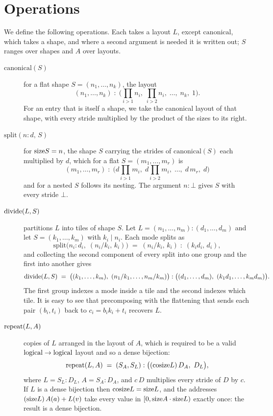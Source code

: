 \section{Operations}\label{sec:ops}

We define the following operations. Each takes a layout $L$, except
$\mathrm{canonical}$, which takes a shape, and where a second argument is
needed it is written out; $S$ ranges over shapes and $A$ over
layouts.

\begin{description}
\item[$\mathrm{canonical}(S)$] for a flat shape $S = (n_1,\dots,n_k)$, the
layout
\[
(n_1,\dots,n_k) \;{:}\; \Big(\textstyle\prod_{i>1} n_i,\;
\prod_{i>2} n_i,\; \dots,\; n_k,\; 1\Big).
\]
For an entry that is itself a shape, we take the canonical layout
of that shape, with every stride multiplied by the product of the sizes to its
right.
\par\smallskip



\item[$\mathrm{split}(n{:}d,\, S)$] for $\mathrm{size} S = n$, the shape $S$ carrying
the strides of $\mathrm{canonical}(S)$ each multiplied by $d$, which for a flat
$S = (m_1,\dots,m_r)$ is
\[
(m_1,\dots,m_r) \;{:}\;
\Big(d\textstyle\prod_{i>1} m_i,\; d\prod_{i>2} m_i,\; \dots,\; d\,m_r,\; d\Big)
\]
and for a nested $S$ follows its nesting. The argument $n{:}\bot$ gives $S$
with every stride $\bot$.
\par\smallskip



\item[$\mathrm{divide}(L, S)$] partitions $L$ into tiles of shape $S$. Let
$L = (n_1,\dots,n_m){:}(d_1,\dots,d_m)$ and let $S = (k_1,\dots,k_m)$ with
$k_i \mid n_i$. Each mode splits as
\[
\mathrm{split}\big(n_i{:}d_i,\; (n_i/k_i,\, k_i)\big)
\;=\; (n_i/k_i,\, k_i) \;{:}\; (k_i d_i,\, d_i),
\]
and collecting the second component of every split into one group and the
first into another gives
\[
\mathrm{divide}(L,S) \;=\;
\big((k_1,\dots,k_m),\ (n_1/k_1,\dots,n_m/k_m)\big)
\;{:}\;
\big((d_1,\dots,d_m),\ (k_1d_1,\dots,k_md_m)\big).
\]
The first group indexes a mode inside a tile and the second indexes which
tile. It is easy to see that precomposing with the flattening that sends each pair
$(b_i, t_i)$ back to $c_i = b_i k_i + t_i$ recovers $L$.
\par\smallskip



\item[$\mathrm{repeat}(L, A)$] copies of $L$ arranged in the layout of $A$, which is
required to be a valid $\textrm{logical} \to \textrm{logical}$ layout and so a dense bijection:
\[
\mathrm{repeat}(L,A) \;=\; (S_A, S_L) \;{:}\; \big((\mathrm{cosize} L)\,D_A,\ D_L\big),
\]
where $L = S_L{:}D_L$, $A = S_A{:}D_A$, and $c\,D$ multiplies every stride of
$D$ by $c$.
If $L$ is a dense bijection then $\mathrm{cosize} L = \mathrm{size} L$, and the addresses
$(\mathrm{size} L)\,A(a) + L(v)$ take every value in $[0, \mathrm{size} A \cdot \mathrm{size} L)$
exactly once: the result is a dense bijection.


\end{description}
